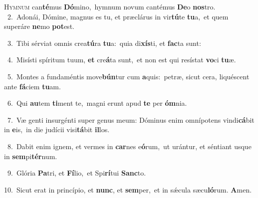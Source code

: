 \lettrine{\initial\textcolor{\initialcolor}{H}}{ymnum} can\-\textbf{té}\-mus \textbf{Dó}\-mino,~\star hymnum novum cantémus \textbf{De}\-o \textbf{nos}\-tro.\\
{\numbfont\textcolor{\numbcolor}{~2.}}~Adonái, Dómine, magnus es tu, et præclárus in vir\-\textbf{tú}\-te \textbf{tu}\-a,~\star et quem superáre \textbf{ne}\-mo \textbf{pot}\-est.\par
{\numbfont\textcolor{\numbcolor}{~3.}}~Tibi sérviat omnis crea\-\textbf{tú}\-ra \textbf{tu}\-a:~\star quia di\-\textbf{xís}\-ti, et \textbf{fac}\-ta sunt:\par
{\numbfont\textcolor{\numbcolor}{~4.}}~Misísti spíritum tuum, \textbf{et} cre\-\textbf{á}\-ta sunt,~\star et non est qui resístat \textbf{vo}\-ci \textbf{tu}\-æ.\par
{\numbfont\textcolor{\numbcolor}{~5.}}~Montes a fundaméntis move\-\textbf{bún}\-tur cum \textbf{a}\-quis:~\star petræ, sicut cera, liquéscent ante \textbf{fá}\-ciem \textbf{tu}\-am.\par
{\numbfont\textcolor{\numbcolor}{~6.}}~Qui \textbf{au}\-tem \textbf{ti}\-ment te,~\star magni erunt apud \textbf{te} per \textbf{óm}\-nia.\par
{\numbfont\textcolor{\numbcolor}{~7.}}~Væ genti insurgénti super genus meum: Dóminus enim omnípotens vindi\-\textbf{cá}\-bit in \textbf{e}\-is,~\star in die judícii visi\-\textbf{tá}\-bit \textbf{il}\-los.\par
{\numbfont\textcolor{\numbcolor}{~8.}}~Dabit enim ignem, et vermes in \textbf{car}\-nes e\-\textbf{ó}\-rum,~\star ut urántur, et séntiant usque in \textbf{sem}\-pi\-\textbf{tér}\-num.\par
{\numbfont\textcolor{\numbcolor}{~9.}}~Glória \textbf{Pa}\-tri, et \textbf{Fí}\-lio,~\star et Spi\-\textbf{rí}\-tui \textbf{Sanc}\-to.\par
{\numbfont\textcolor{\numbcolor}{10.}}~Sicut erat in princípio, et \textbf{nunc}\-, et \textbf{sem}\-per,~\star et in sǽcula sæcu\-\textbf{ló}\-rum. \textbf{A}\-men.\par
